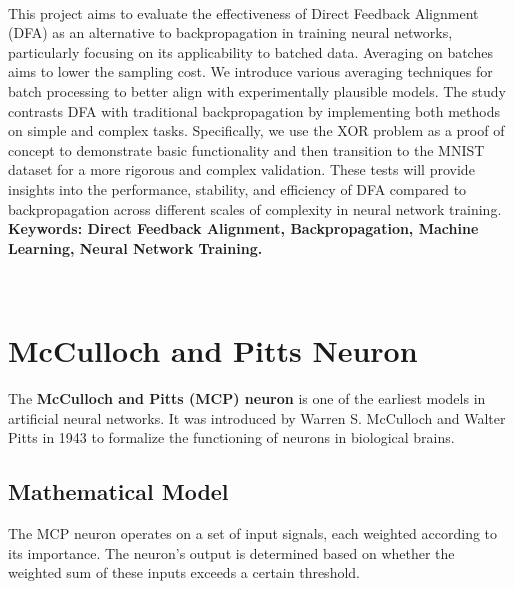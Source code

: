 \documentclass[english]{article}
\begin{document}
\begin{center}
  \hrulefill\\[0.2cm]
  \begin{minipage}{0.9\textwidth}
      \centering
      This project aims to evaluate the effectiveness of Direct Feedback Alignment (DFA) as an alternative to backpropagation in training neural networks, particularly focusing on its applicability to batched data. Averaging on batches aims to lower the sampling cost. We introduce various averaging techniques for batch processing to better align with experimentally plausible models. The study contrasts DFA with traditional backpropagation by implementing both methods on simple and complex tasks. Specifically, we use the XOR problem as a proof of concept to demonstrate basic functionality and then transition to the MNIST dataset for a more rigorous and complex validation. These tests will provide insights into the performance, stability, and efficiency of DFA compared to backpropagation across different scales of complexity in neural network training.\\
      \textbf{Keywords: Direct Feedback Alignment, Backpropagation, Machine Learning, Neural Network Training.}

  \end{minipage}\\[0.2cm]
  \hrulefill
\end{center}











\section{McCulloch and Pitts Neuron}

The \textbf{McCulloch and Pitts (MCP) neuron}\cite{mcculloch43a} is one of the earliest models in artificial neural networks. It was introduced by Warren S. McCulloch and Walter Pitts in 1943 to formalize the functioning of neurons in biological brains.

\subsection{Mathematical Model}

The MCP neuron operates on a set of input signals, each weighted according to its importance. The neuron's output is determined based on whether the weighted sum of these inputs exceeds a certain threshold.
\end{document}

